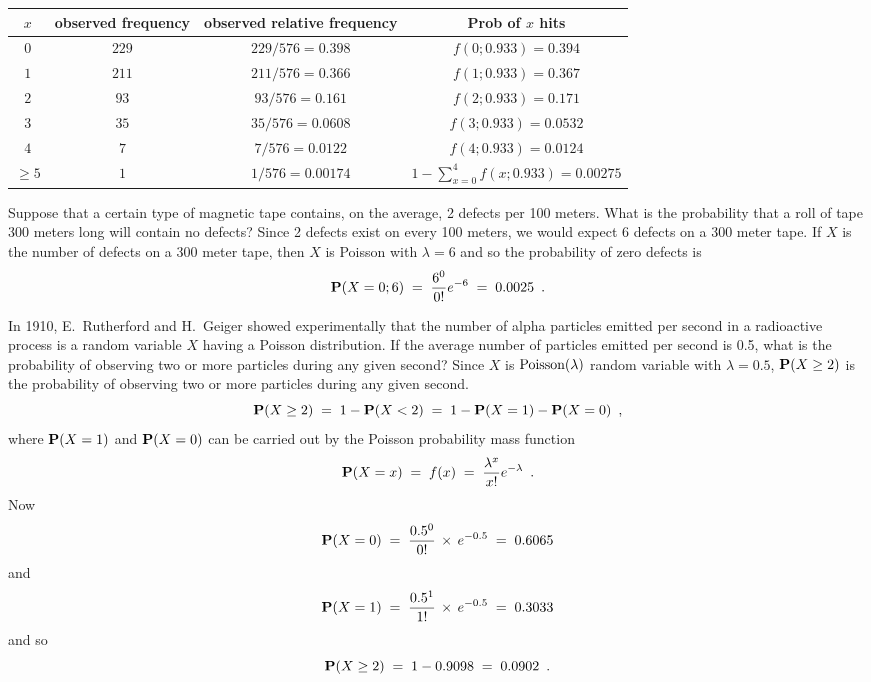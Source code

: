 \begin{ExerciseList}
\begin{center}
{\small
\begin{tabular}{|c|c|c|c|}
\hline
$x$ & observed frequency & observed relative frequency & Prob of $x$ hits\\\hline
$0$ & $229$ & $229/576=0.398$ & $f(0;0.933) = 0.394$\\
$1$ & $211$ & $211/576=0.366$ & $f(1;0.933) = 0.367$\\
$2$ & $93$ & $93/576=0.161$ & $f(2;0.933) = 0.171$\\
$3$ & $35$ & $35/576=0.0608$ & $f(3;0.933) = 0.0532$\\
$4$ & $7$ & $7/576=0.0122$ & $f(4;0.933) = 0.0124$\\
$\geq 5$ & $1$ & $1/576=0.00174$ & $1-\sum_{x=0}^4f(x;0.933) = 0.00275$\\\hline
\end{tabular}
}
\end{center}

\Exercise 
Suppose that a certain type of magnetic tape contains, on the average, 2 defects per 100 meters.  
What is the probability that a roll of tape 300 meters long will contain  no defects?
\Answer
Since 2 defects exist on every 100 meters, we would expect 6 defects on a 300 meter tape.  
If $X$ is the number of defects on a 300 meter tape, then $X$ is Poisson with $\lambda = 6$ and so the probability of zero defects is
$$\mathbf{P}(X=0;6)\;=\;\frac{6^0}{0!}e^{-6}\;=\;0.0025\enspace.$$

\Exercise
In 1910, E.~Rutherford and H.~Geiger showed experimentally that the number of alpha particles emitted per second in a radioactive process is a random variable $X$ having a Poisson distribution. If the average number of particles emitted per second is  0.5, what is the probability of observing two or more particles during any given second?
\Answer
Since $X$ is $\mbox{{\rm Poisson}}(\lambda)$ random variable with $\lambda=0.5$, $\mathbf{P}(X\geq2)$ 
is the probability of observing two or more particles during any
given second. $$\mathbf{P}(X\geq 2)\;=\;1-\mathbf{P}(X<2)\;=\;1-\mathbf{P}(X=1)-\mathbf{P}(X=0)\enspace,$$
where $\mathbf{P}(X=1)$ and $\mathbf{P}(X=0)$ can be carried out by the Poisson
probability mass function $$\mathbf{P}(X=x)\;=\; f(x)\;=\;\frac{\lambda^x}{x!}e^{-\lambda}\enspace.$$
Now \[\mathbf{P}(X=0)\;=\;\frac{0.5^0}{0!}\,\times \,e^{-0.5} \;=\; 0.6065\] and
\[ \mathbf{P}(X=1)\;=\;\frac{0.5^1}{1!}\,\times \, e^{-0.5}\;=\; 0.3033\] and so
$$\mathbf{P}(X\geq 2)\;=\; 1- 0.9098\;= \;0.0902\enspace.$$


\end{ExerciseList}
